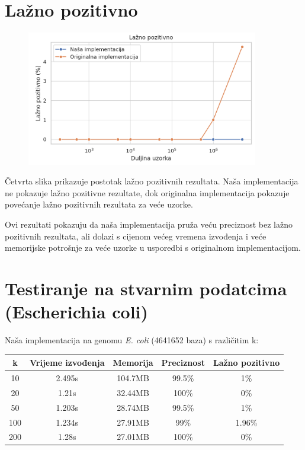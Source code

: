 \documentclass[seminarskirad]{fer}
\begin{document}
\section{Lažno pozitivno}
\begin{figure}[h]
	\centering
	\includegraphics[width=0.9\textwidth]{images/nasumicni_rezultati_lazno.png}
	\label{fig:nasumicni_rezultati_lazno}
\end{figure}
Četvrta slika prikazuje postotak lažno pozitivnih rezultata. Naša implementacija ne pokazuje lažno pozitivne rezultate, dok originalna implementacija pokazuje povećanje lažno pozitivnih rezultata za veće uzorke.

Ovi rezultati pokazuju da naša implementacija pruža veću preciznost bez lažno pozitivnih rezultata, ali dolazi s cijenom većeg vremena izvođenja i veće memorijske potrošnje za veće uzorke u usporedbi s originalnom implementacijom.


\section{Testiranje na stvarnim podatcima (Escherichia coli)}
Naša implementacija na genomu \textit{E. coli} (4641652 baza) s različitim k:

\begin{center}
	\small
	\begin{tabular}{||c c c c c||} 
		\hline
		k & Vrijeme izvođenja & Memorija & Preciznost & Lažno pozitivno \\ [0.5ex] 
		\hline\hline
		10 & 2.495s & 104.7MB & 99.5\% & 1\% \\ 
		\hline
		20 & 1.21s & 32.44MB & 100\% & 0\% \\
		\hline
		50 & 1.203s & 28.74MB & 99.5\% & 1\% \\
		\hline
		100 & 1.234s & 27.91MB & 99\% & 1.96\% \\
		\hline
		200 & 1.28s & 27.01MB & 100\% & 0\% \\ [1ex] 
		\hline
	\end{tabular}
\end{center}
\end{document}
